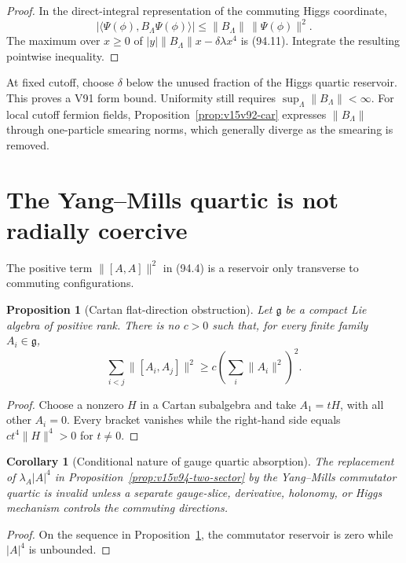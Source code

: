 \documentclass[11pt]{article}
\newtheorem{proposition}[theorem]{Proposition}
\newtheorem{corollary}[theorem]{Corollary}
\theoremstyle{remark}
\begin{document}
\begin{proof}
In the direct-integral representation of the commuting Higgs
coordinate,
\[
 |\langle\Psi(\phi),B_\Lambda\Psi(\phi)\rangle|
 \leq\|B_\Lambda\|\,\|\Psi(\phi)\|^2.                 \tag{94.12}
\]
The maximum over \(x\geq0\) of
\(|y|\|B_\Lambda\|x-\delta\lambda x^4\) is (94.11).
Integrate the resulting pointwise inequality.
\end{proof}

At fixed cutoff, choose \(\delta\) below the unused fraction of the
Higgs quartic reservoir.  This proves a V91 form bound.  Uniformity
still requires \(\sup_\Lambda\|B_\Lambda\|<\infty\).
For local cutoff fermion fields, Proposition~\ref{prop:v15v92-car}
expresses \(\|B_\Lambda\|\) through one-particle smearing norms,
which generally diverge as the smearing is removed.

\section{The Yang--Mills quartic is not radially coercive}

The positive term \(\|[A,A]\|^2\) in (94.4) is a reservoir only
transverse to commuting configurations.

\begin{proposition}[Cartan flat-direction obstruction]
\label{prop:v15v94-cartan}
Let \(\mathfrak g\) be a compact Lie algebra of positive rank.  There
is no \(c>0\) such that, for every finite family \(A_i\in\mathfrak g\),
\[
 \sum_{i<j}\|[A_i,A_j]\|^2
 \geq c\left(\sum_i\|A_i\|^2\right)^2.                \tag{94.13}
\]
\end{proposition}

\begin{proof}
Choose a nonzero \(H\) in a Cartan subalgebra and take
\(A_1=tH\), with all other \(A_i=0\).  Every bracket vanishes while
the right-hand side equals \(ct^4\|H\|^4>0\) for \(t\ne0\).
\end{proof}

\begin{corollary}[Conditional nature of gauge quartic absorption]
\label{cor:v15v94-gauge-flat}
The replacement of \(\lambda_A|A|^4\) in
Proposition~\ref{prop:v15v94-two-sector} by the Yang--Mills
commutator quartic is invalid unless a separate gauge-slice,
derivative, holonomy, or Higgs mechanism controls the commuting
directions.
\end{corollary}

\begin{proof}
On the sequence in Proposition~\ref{prop:v15v94-cartan}, the
commutator reservoir is zero while \(|A|^4\) is unbounded.
\end{proof}
\end{document}

